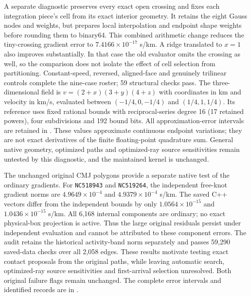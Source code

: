 A separate diagnostic preserves every exact open crossing and fixes each
integration piece's cell from its exact interior geometry. It retains the
eight Gauss nodes and weights, but prepares local interpolation and endpoint
shape weights before rounding them to binary64. This combined arithmetic
change reduces the tiny-crossing gradient error to $7.4166\times10^{-17}$
s/km. A ridge translated to $x=1$ also improves substantially. In that case
the old evaluator omits the crossing as well, so the comparison does not
isolate the effect of cell selection from partitioning. Constant-speed,
reversed, aligned-face and genuinely trilinear controls complete the nine-case
roster; 59 structural checks pass. The three-dimensional field is
$v=(2+x)(3+y)(4+z)$ with coordinates in km and velocity in km/s, evaluated
between $(-1/4,0,-1/4)$ and $(1/4,1,1/4)$. Its reference uses fixed rational
bounds with reciprocal-series degree 16 (17 retained powers), four subdivisions
and 192 bound bits.
All approximation-error intervals are retained in
.
These values approximate continuous endpoint variations; they are not exact
derivatives of the finite floating-point quadrature sum. General native
geometry, optimized paths and optimized-ray source sensitivities remain untested by this
diagnostic, and the maintained kernel is unchanged.

The unchanged original CMJ polygons provide a separate native test of the
ordinary gradients. For \texttt{NC518943} and \texttt{NC519264}, the
independent free-knot gradient norms are $4.9649\times10^{-4}$ and
$4.9379\times10^{-4}$ s/km. The saved C++ vectors differ from the independent
bounds by only $1.0564\times10^{-15}$ and $1.0436\times10^{-15}$ s/km.
All 6,168 internal components are ordinary; no exact physical-box projection
is active. Thus the large original residuals persist under independent
evaluation and cannot be attributed to these component errors. The audit
retains the historical activity-band norm separately and passes 59,290
saved-data checks over all 2,058 edges. These results motivate testing exact
contact proposals from the original paths, while leaving automatic search,
optimized-ray source sensitivities and first-arrival selection unresolved.
Both original failure flags remain unchanged. The complete error intervals
and identified records are in
.

